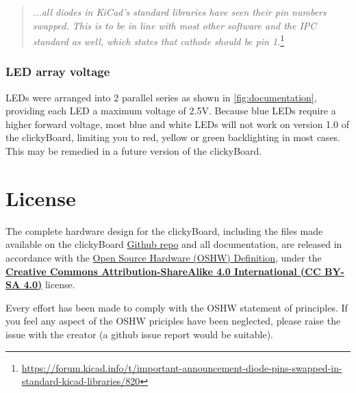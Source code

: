 \documentclass[10pt, a4paper, onesided]{article}
\begin{document}
		\begin{quote}
			\textit{...all diodes in KiCad's standard libraries have seen their pin numbers swapped. This is to be in line with most other software and the IPC standard as well, which states that cathode should be pin 1.}\footnote{\url{https://forum.kicad.info/t/important-announcement-diode-pins-swapped-in-standard-kicad-libraries/820}}
		\end{quote}
	
		\subsubsection*{LED array voltage}
		\label{LEDerror2}
		
		LEDs were arranged into 2 parallel series as shown in \autoref{fig:documentation}, providing each LED a maximum voltage of 2.5V. Because blue LEDs require a higher forward voltage, most blue and white LEDs will not work on version 1.0 of the clickyBoard, limiting you to red, yellow or green backlighting in most cases. This may be remedied in a future version of the clickyBoard.

\section{License}

	The complete hardware design for the clickyBoard, including the files made available on the clickyBoard \href{https://github.com/SecretImbecile/clickyBoard}{Github repo} and all documentation, are released in accordance with the \href{https://www.oshwa.org/definition/}{Open Source Hardware (OSHW) Definition}, under the \href{https://creativecommons.org/licenses/by-sa/4.0/}{\textbf{Creative Commons Attribution-ShareAlike 4.0 International (CC BY-SA 4.0)}} license.
	
	Every effort has been made to comply with the OSHW statement of principles. If you feel any aspect of the OSHW priciples have been neglected, please raise the issue with the creator (a github issue report would be suitable).
\end{document}
